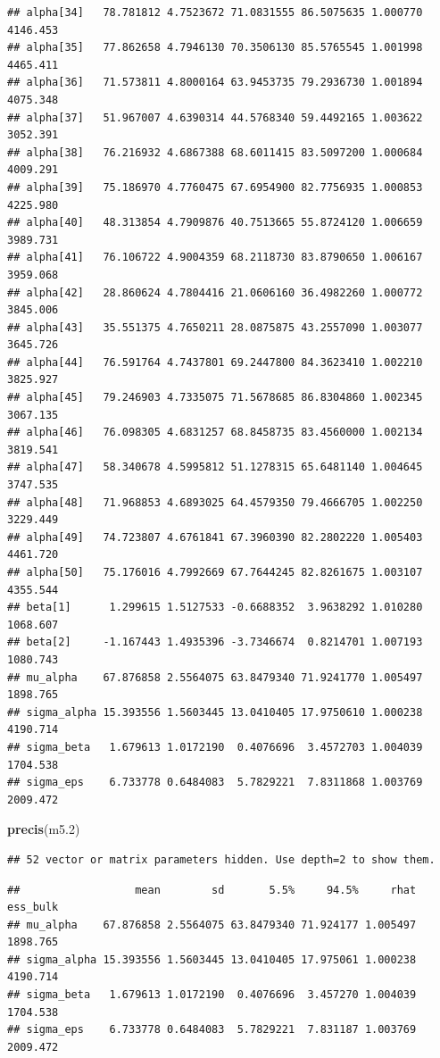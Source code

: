 \documentclass[
]{book}
\newenvironment{Shaded}{\begin{snugshade}}{\end{snugshade}}
\newcommand{\FloatTok}[1]{\textcolor[rgb]{0.00,0.00,0.81}{#1}}
\newcommand{\FunctionTok}[1]{\textcolor[rgb]{0.13,0.29,0.53}{\textbf{#1}}}
\newcommand{\NormalTok}[1]{#1}
\begin{document}
\begin{verbatim}
## alpha[34]   78.781812 4.7523672 71.0831555 86.5075635 1.000770 4146.453
## alpha[35]   77.862658 4.7946130 70.3506130 85.5765545 1.001998 4465.411
## alpha[36]   71.573811 4.8000164 63.9453735 79.2936730 1.001894 4075.348
## alpha[37]   51.967007 4.6390314 44.5768340 59.4492165 1.003622 3052.391
## alpha[38]   76.216932 4.6867388 68.6011415 83.5097200 1.000684 4009.291
## alpha[39]   75.186970 4.7760475 67.6954900 82.7756935 1.000853 4225.980
## alpha[40]   48.313854 4.7909876 40.7513665 55.8724120 1.006659 3989.731
## alpha[41]   76.106722 4.9004359 68.2118730 83.8790650 1.006167 3959.068
## alpha[42]   28.860624 4.7804416 21.0606160 36.4982260 1.000772 3845.006
## alpha[43]   35.551375 4.7650211 28.0875875 43.2557090 1.003077 3645.726
## alpha[44]   76.591764 4.7437801 69.2447800 84.3623410 1.002210 3825.927
## alpha[45]   79.246903 4.7335075 71.5678685 86.8304860 1.002345 3067.135
## alpha[46]   76.098305 4.6831257 68.8458735 83.4560000 1.002134 3819.541
## alpha[47]   58.340678 4.5995812 51.1278315 65.6481140 1.004645 3747.535
## alpha[48]   71.968853 4.6893025 64.4579350 79.4666705 1.002250 3229.449
## alpha[49]   74.723807 4.6761841 67.3960390 82.2802220 1.005403 4461.720
## alpha[50]   75.176016 4.7992669 67.7644245 82.8261675 1.003107 4355.544
## beta[1]      1.299615 1.5127533 -0.6688352  3.9638292 1.010280 1068.607
## beta[2]     -1.167443 1.4935396 -3.7346674  0.8214701 1.007193 1080.743
## mu_alpha    67.876858 2.5564075 63.8479340 71.9241770 1.005497 1898.765
## sigma_alpha 15.393556 1.5603445 13.0410405 17.9750610 1.000238 4190.714
## sigma_beta   1.679613 1.0172190  0.4076696  3.4572703 1.004039 1704.538
## sigma_eps    6.733778 0.6484083  5.7829221  7.8311868 1.003769 2009.472
\end{verbatim}

\begin{Shaded}
\begin{Highlighting}[]
\FunctionTok{precis}\NormalTok{(m5}\FloatTok{.2}\NormalTok{)}
\end{Highlighting}
\end{Shaded}

\begin{verbatim}
## 52 vector or matrix parameters hidden. Use depth=2 to show them.
\end{verbatim}

\begin{verbatim}
##                  mean        sd       5.5%     94.5%     rhat ess_bulk
## mu_alpha    67.876858 2.5564075 63.8479340 71.924177 1.005497 1898.765
## sigma_alpha 15.393556 1.5603445 13.0410405 17.975061 1.000238 4190.714
## sigma_beta   1.679613 1.0172190  0.4076696  3.457270 1.004039 1704.538
## sigma_eps    6.733778 0.6484083  5.7829221  7.831187 1.003769 2009.472
\end{verbatim}
\end{document}
